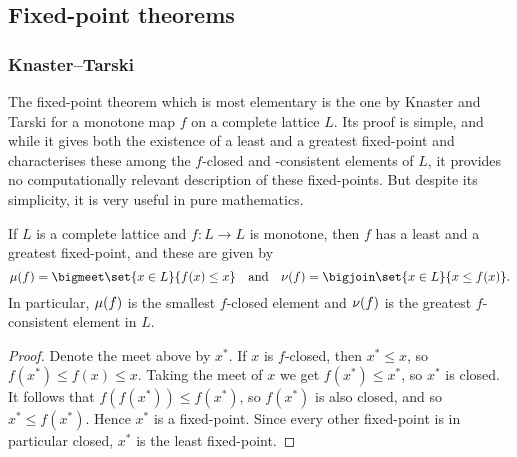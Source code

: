 \subsection{Fixed-point theorems}

\subsubsection{Knaster--Tarski}

The fixed-point theorem which is most elementary is the one by Knaster and Tarski for a monotone map $f$ on a complete lattice $L$. Its proof is simple, and while it gives both the existence of a least and a greatest fixed-point and characterises these among the $f$-closed and -consistent elements of $L$, it provides no computationally relevant description of these fixed-points. But despite its simplicity, it is very useful in pure mathematics.


\begin{theorem}
    \label{thm:knaster-tarski}
    If $L$ is a complete lattice and $f \colon L \to L$ is monotone, then $f$ has a least and a greatest fixed-point, and these are given by
    \begin{equation*}
        \lfp{f}
            = \bigmeet \set{x \in L}{f(x) \leq x}
        \quad \text{and} \quad
        \gfp{f}
            = \bigjoin \set{x \in L}{x \leq f(x)}.
    \end{equation*}
    In particular, $\lfp{f}$ is the smallest $f$-closed element and $\gfp{f}$ is the greatest $f$-consistent element in $L$.
\end{theorem}

\begin{proof}
    Denote the meet above by $x^*$. If $x$ is $f$-closed, then $x^* \leq x$, so $f(x^*) \leq f(x) \leq x$. Taking the meet of $x$ we get $f(x^*) \leq x^*$, so $x^*$ is closed. It follows that $f(f(x^*)) \leq f(x^*)$, so $f(x^*)$ is also closed, and so $x^* \leq f(x^*)$. Hence $x^*$ is a fixed-point. Since every other fixed-point is in particular closed, $x^*$ is the least fixed-point.
\end{proof}


